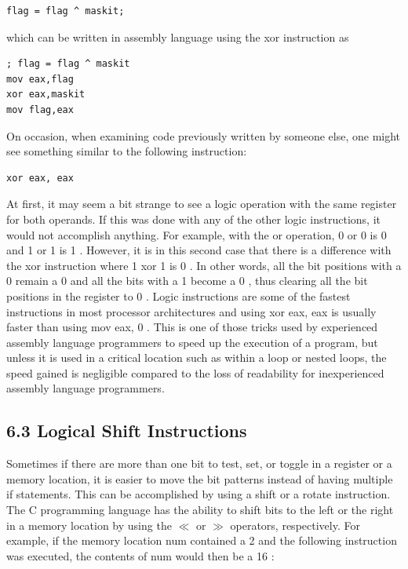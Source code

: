 \documentclass[10pt]{book}
\begin{document}
\begin{verbatim}
flag = flag ^ maskit;
\end{verbatim}

which can be written in assembly language using the xor instruction as


\begin{verbatim}
; flag = flag ^ maskit
mov eax,flag
xor eax,maskit
mov flag,eax
\end{verbatim}

On occasion, when examining code previously written by someone else, one might see something similar to the following instruction:

\begin{verbatim}
xor eax, eax
\end{verbatim}

At first, it may seem a bit strange to see a logic operation with the same register for both operands. If this was done with any of the other logic instructions, it would not accomplish anything. For example, with the or operation, 0 or 0 is 0 and 1 or 1 is 1 . However, it is in this second case that there is a difference with the xor instruction where 1 xor 1 is 0 . In other words, all the bit positions with a 0 remain a 0 and all the bits with a 1 become a 0 , thus clearing all the bit positions in the register to 0 . Logic instructions are some of the fastest instructions in most processor architectures and using xor eax, eax is usually faster than using mov eax, 0 . This is one of those tricks used by experienced assembly language programmers to speed up the execution of a program, but unless it is used in a critical location such as within a loop or nested loops, the speed gained is negligible compared to the loss of readability for inexperienced assembly language programmers.

\subsection*{6.3 Logical Shift Instructions}
Sometimes if there are more than one bit to test, set, or toggle in a register or a memory location, it is easier to move the bit patterns instead of having multiple if statements. This can be accomplished by using a shift or a rotate instruction. The C programming language has the ability to shift bits to the left or the right in a memory location by using the $\ll$ or $\gg$ operators, respectively. For example, if the memory location num contained a 2 and the following instruction was executed, the contents of num would then be a 16 :
\end{document}
